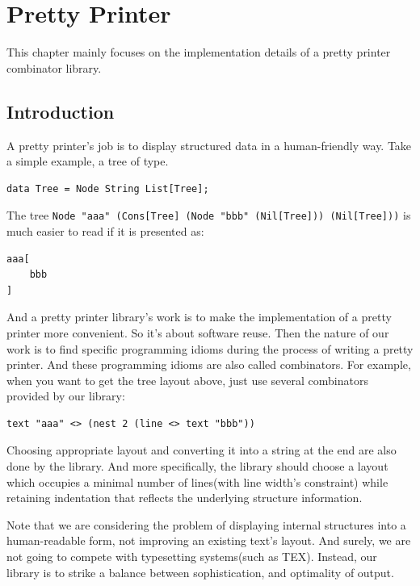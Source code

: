 \chapter{Pretty Printer}
This chapter mainly focuses on the implementation details of a pretty printer combinator library.

\section{Introduction}

A pretty printer's job is to display structured data in a human-friendly way. Take a simple example, a tree of type.

\begin{lstlisting}
data Tree = Node String List[Tree];
\end{lstlisting}

The tree \texttt{Node "aaa" (Cons[Tree] (Node "bbb" (Nil[Tree])) (Nil[Tree]))} is much easier to read if it is presented as:

\begin{lstlisting}
aaa[
    bbb
]
\end{lstlisting}

And a pretty printer library's work is to make the implementation of a pretty printer more convenient. So it's about software reuse. Then the nature of our work is to find specific programming idioms during the process of writing a pretty printer. And these programming idioms are also called combinators. For example, when you want to get the tree layout above, just use several combinators provided by our library:

\begin{lstlisting}
text "aaa" <> (nest 2 (line <> text "bbb"))
\end{lstlisting}

Choosing appropriate layout and converting it into a string at the end are also done by the library. And more specifically, the library should choose a layout which occupies a minimal number of lines(with line width's constraint) while retaining indentation that reflects the underlying structure information.

\begin{remark}
Note that we are considering the problem of displaying internal structures into a human-readable form, not improving an existing text's layout. And surely, we are not going to compete with typesetting systems(such as TEX). Instead, our library is to strike a balance between sophistication, and optimality of output.
\end{remark}


